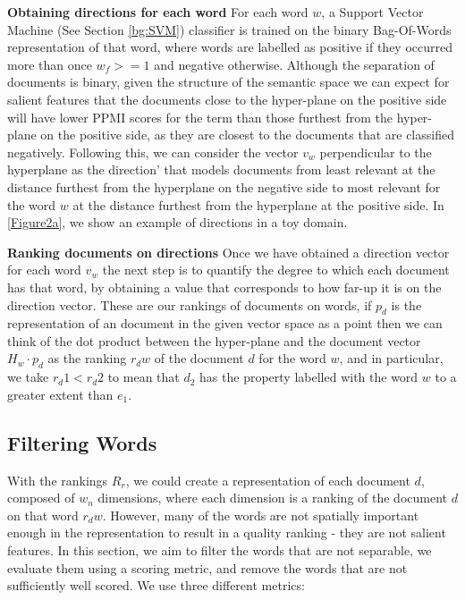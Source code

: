 \noindent \textbf{Obtaining directions for each word} For each word $w$, a Support Vector Machine (See Section \ref{bg:SVM}) classifier is trained on the binary Bag-Of-Words representation of that word, where words are labelled as positive if they occurred more than once $w_f >= 1$ and negative otherwise. Although the separation of documents is binary, given the structure of the semantic space we can expect for salient features that the documents close to the hyper-plane on the positive side will have lower PPMI scores for the term than those furthest from the hyper-plane on the positive side, as they are closest to the documents that are classified negatively. Following this, we can consider the vector $v_w$ perpendicular to the hyperplane as the direction' that models documents from least relevant at the distance furthest from the hyperplane on the negative side to most relevant for the word $w$ at the distance furthest from the hyperplane at the positive side. In \ref{Figure2a}, we show an example of directions in a toy domain. %

\noindent \textbf{Ranking documents on directions} Once we have obtained a direction vector for each word $v_w$ the next step is to quantify the degree to which each document has that word, by obtaining a value that corresponds to how far-up it is on the direction vector. These are our rankings of documents on words, if $p_d$ is the representation of an document in the given vector space as a point then we can think of the dot product between the hyper-plane and the document vector $H_w \cdot p_d$ as the ranking $r_dw$ of the document $d$ for the word $w$, and in particular, we take $r_d1 < r_d2$ to mean that $d_2$ has the property labelled with the word $w$ to a greater extent than $e_1$.  %

\subsection{Filtering Words}

With the rankings $R_r$, we could create a representation of each document $d$, composed of $w_n$ dimensions, where each dimension is a ranking of the document $d$ on that word $r_dw$. However, many of the words are not spatially important enough in the representation to result in a quality ranking - they are not salient features. In this section, we aim to filter the words that are not separable, we evaluate them using a scoring metric, and remove the words that are not sufficiently well scored. We use three different metrics:

